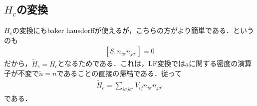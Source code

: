\documentclass[a4j]{jarticle}
\begin{document}

\subsection{$H_{c}$の変換}
$H_{c}$の変換にもbaker hausdorffが使えるが，こちらの方がより簡単である．というのも
\begin{align}
 \left[S,n_{i\sigma}n_{j\sigma'}\right]=0
\end{align}
だから，$\tilde{H}_c=H_c$となるためである．これは，LF変換では$a$に関する密度の演算子が不変で$\tilde{n}=n$であることの直接の帰結である．従って
\begin{align}
 \tilde{H}_c=\sum_{i\sigma j\sigma'}V_{ij}n_{i\sigma}n_{j\sigma'}
\end{align}
である．
\end{document}
